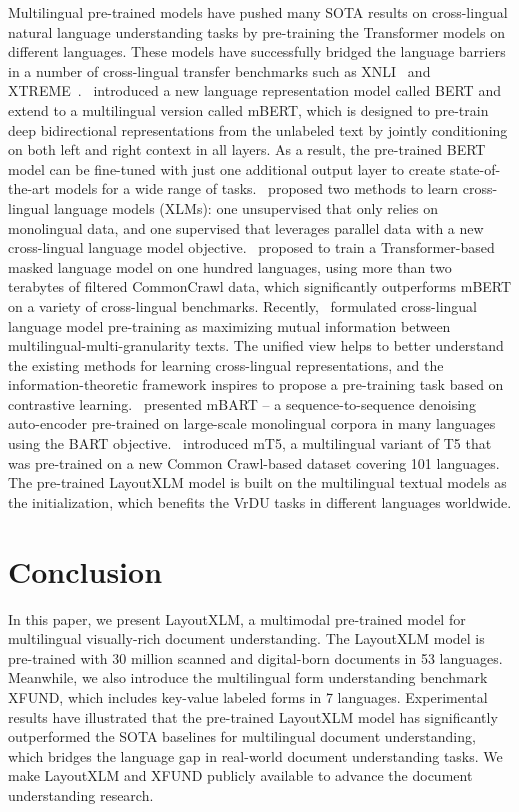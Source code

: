 \documentclass[11pt]{article}
\newcommand{\task}{\textsc{XFUND}\xspace}
\begin{document}
Multilingual pre-trained models have pushed many SOTA results on cross-lingual natural language understanding tasks by pre-training the Transformer models on different languages. These models have successfully bridged the language barriers in a number of cross-lingual transfer benchmarks such as XNLI~\citep{conneau2018xnli} and XTREME~\citep{hu2020xtreme}.~\citet{devlin2018bert} introduced a new language representation model called BERT and extend to a multilingual version called mBERT, which is designed to pre-train deep bidirectional representations from the unlabeled text by jointly conditioning on both left and right context in all layers. As a result, the pre-trained BERT model can be fine-tuned with just one additional output layer to create state-of-the-art models for a wide range of tasks.~\citet{lample2019crosslingual} proposed two methods to learn cross-lingual language models (XLMs): one unsupervised that only relies on monolingual data, and one supervised that leverages parallel data with a new cross-lingual language model objective.~\citet{conneau2020unsupervised} proposed to train a Transformer-based masked language model on one hundred languages, using more than two terabytes of filtered CommonCrawl data, which significantly outperforms mBERT on a variety of cross-lingual benchmarks. Recently,~\citet{chi2020infoxlm} formulated cross-lingual language model pre-training as maximizing mutual information between multilingual-multi-granularity texts. The unified view helps to better understand the existing methods for learning cross-lingual representations, and the information-theoretic framework inspires to propose a pre-training task based on contrastive learning.~\citet{liu2020multilingual} presented mBART -- a sequence-to-sequence denoising auto-encoder pre-trained on large-scale monolingual corpora in many languages using the BART objective.~\citet{xue2020mt5} introduced mT5, a multilingual variant of T5 that was pre-trained on a new Common Crawl-based dataset covering 101 languages. The pre-trained LayoutXLM model is built on the multilingual
textual models as the initialization, which benefits the VrDU tasks in different languages worldwide.

\section{Conclusion}

In this paper, we present LayoutXLM, a multimodal pre-trained model for multilingual visually-rich document understanding. 
The LayoutXLM model is pre-trained with 30 million scanned and digital-born documents in 53 languages.
Meanwhile, we also introduce the multilingual form understanding benchmark \task, which includes key-value labeled forms in 7 languages. Experimental results have illustrated that the pre-trained LayoutXLM model has significantly outperformed
the SOTA baselines for multilingual document understanding, which bridges the language gap in real-world document understanding tasks. We make LayoutXLM and \task publicly available to advance the document understanding research.
\end{document}
